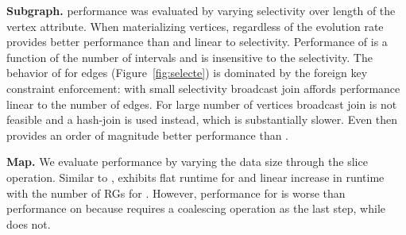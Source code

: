 {\bf Subgraph.}   performance was evaluated by varying
selectivity over length of the vertex attribute.  When materializing
vertices, regardless of the evolution rate \ve provides better
performance than \sg and linear to selectivity.  Performance of \sg is
a function of the number of intervals and is insensitive to
the selectivity.  The behavior of \ve for edges
(Figure~\ref{fig:selecte}) is dominated by the foreign key constraint
enforcement: with small selectivity broadcast join affords performance
linear to the number of edges.  For large number of vertices broadcast
join is not feasible and a hash-join is used instead, which is
substantially slower.  Even then \ve provides an order of magnitude
better performance than \sg.

{\bf Map.}  We evaluate  performance by varying the
data size through the slice operation.  Similar to ,
 exhibits flat runtime for \ve and linear increase in
runtime with the number of RGs for \sg.  However, performance for \ve
is worse than performance on  because 
requires a coalescing operation as the last step, while 
does not.

